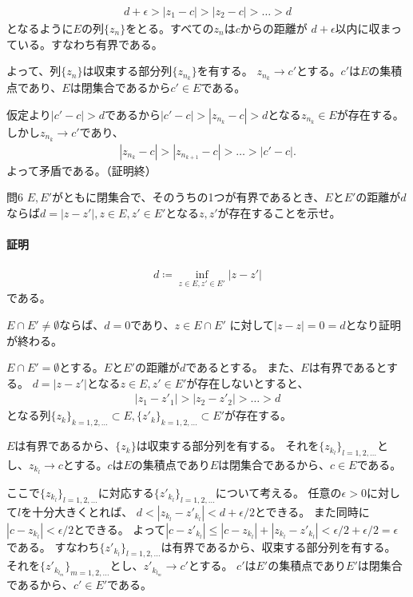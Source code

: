 \begin{align*}
    d+\epsilon>|z_1-c|>|z_2-c|>\dots>d
\end{align*}
となるように$E$の列$\{z_n\}$をとる。すべての$z_n$は$c$からの距離が
$d+\epsilon$以内に収まっている。すなわち有界である。

よって、列$\{z_n\}$は収束する部分列$\{z_{n_k}\}$を有する。
$z_{n_k}\longrightarrow c'$とする。$c'$は$E$の集積点であり、$E$は閉集合であるから$c'\in E$である。

仮定より$|c'-c|>d$であるから$|c'-c|>|z_{n_k}-c|>d$となる$z_{n_k}\in E$が存在する。しかし$z_{n_k}\longrightarrow c'$であり、
\begin{align*}
    |z_{n_k}-c|>|z_{n_{k+1}}-c|>\dots>|c'-c|.
\end{align*}
よって矛盾である。（証明終）

\begin{mysimplebox}{問6}
    $E, E'$がともに閉集合で、そのうちの1つが有界であるとき、$E$と$E'$の距離が$d$ならば$d=|z-z'|, z\in E, z'\in E'$となる$z, z'$が存在することを示せ。
\end{mysimplebox}
\paragraph{証明}
\begin{align*}
    d\coloneqq \inf_{z\in E, z'\in E'}|z-z'|
\end{align*}
である。

$E\cap E'\neq \emptyset$ならば、$d=0$であり、$z\in E\cap E'$
に対して$|z-z|=0=d$となり証明が終わる。

$E\cap E'=\emptyset$とする。$E$と$E'$の距離が$d$であるとする。
また、$E$は有界であるとする。
$d=|z-z'|$となる$z\in E, z'\in E'$が存在しないとすると、
\begin{align*}
    |z_1-z'_1|>|z_2-z'_2|>\dots>d
\end{align*}
となる列$\{z_k\}_{k=1,2,\dots}\subset E, \{z'_k\}_{k=1,2,\dots}\subset E'$が存在する。

$E$は有界であるから、$\{z_k\}$は収束する部分列を有する。
それを$\{z_{k_l}\}_{l=1,2,\dots}$とし、$z_{k_l}\longrightarrow c$とする。$c$は$E$の集積点であり$E$は閉集合であるから、$c\in E$である。

ここで$\{z_{k_l}\}_{l=1,2,\dots}$に対応する$\{z'_{k_l}\}_{l=1,2,\dots}$について考える。
任意の$\epsilon>0$に対して$l$を十分大きくとれば、
$d<|z_{k_l}-z'_{k_l}|<d+\epsilon/2$とできる。
また同時に$|c-z_{k_l}|<\epsilon/2$とできる。
よって$|c-z'_{k_l}|\le|c-z_{k_l}|+|z_{k_l}-z'_{k_l}|<\epsilon/2+\epsilon/2=\epsilon$である。
すなわち$\{z'_{k_l}\}_{l=1,2,\dots}$は有界であるから、収束する部分列を有する。
それを$\{z'_{k_{l_m}}\}_{m=1,2,\dots}$とし、$z'_{k_{l_m}}\rightarrow c'$とする。
$c'$は$E'$の集積点であり$E'$は閉集合であるから、$c'\in E'$である。


